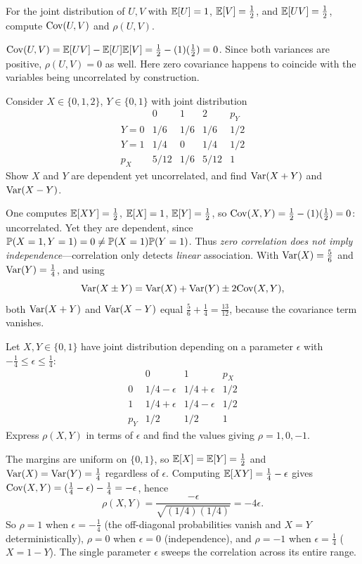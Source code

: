 \begin{example}
For the joint distribution of $U,V$ with
$\mathbb{E}[U]=1$, $\mathbb{E}[V]=\tfrac12$, and $\mathbb{E}[UV]=\tfrac12$, compute $\mathrm{Cov}(U,V)$ and
$\rho(U,V)$.

\solution $\mathrm{Cov}(U,V)=\mathbb{E}[UV]-\mathbb{E}[U]\mathbb{E}[V]=\tfrac12-(1)(\tfrac12)=0$. Since both
variances are positive, $\rho(U,V)=0$ as well. Here zero covariance happens to
coincide with the variables being uncorrelated by construction.
\end{example}

\begin{example}
Consider $X\in\{0,1,2\}$, $Y\in\{0,1\}$ with joint distribution
\[
\begin{array}{c|ccc|c}
 & 0 & 1 & 2 & p_Y\\\hline
 Y=0 & 1/6 & 1/6 & 1/6 & 1/2\\
 Y=1 & 1/4 & 0 & 1/4 & 1/2\\\hline
 p_X & 5/12 & 1/6 & 5/12 & 1
\end{array}
\]
Show $X$ and $Y$ are dependent yet uncorrelated, and find $\mathrm{Var}(X+Y)$ and
$\mathrm{Var}(X-Y)$.

\solution One computes $\mathbb{E}[XY]=\tfrac12$, $\mathbb{E}[X]=1$, $\mathbb{E}[Y]=\tfrac12$, so
$\mathrm{Cov}(X,Y)=\tfrac12-(1)(\tfrac12)=0$: uncorrelated. Yet they are dependent, since
$\mathbb{P}(X=1,Y=1)=0\neq\mathbb{P}(X=1)\mathbb{P}(Y=1)$. Thus \emph{zero correlation does not
imply independence}—correlation only detects \emph{linear} association. With
$\mathrm{Var}(X)=\tfrac56$ and $\mathrm{Var}(Y)=\tfrac14$, and using
\[
  \mathrm{Var}(X\pm Y)=\mathrm{Var}(X)+\mathrm{Var}(Y)\pm 2\mathrm{Cov}(X,Y),
\]
both $\mathrm{Var}(X+Y)$ and $\mathrm{Var}(X-Y)$ equal $\tfrac56+\tfrac14=\tfrac{13}{12}$,
because the covariance term vanishes.
\end{example}

\begin{example}
Let $X,Y\in\{0,1\}$ have joint distribution depending on a parameter $\epsilon$
with $-\tfrac14\le\epsilon\le\tfrac14$:
\[
\begin{array}{c|cc|c}
 & 0 & 1 & p_X\\\hline
 0 & 1/4-\epsilon & 1/4+\epsilon & 1/2\\
 1 & 1/4+\epsilon & 1/4-\epsilon & 1/2\\\hline
 p_Y & 1/2 & 1/2 & 1
\end{array}
\]
Express $\rho(X,Y)$ in terms of $\epsilon$ and find the values giving
$\rho=1,0,-1$.

\solution The margins are uniform on $\{0,1\}$, so $\mathbb{E}[X]=\mathbb{E}[Y]=\tfrac12$ and
$\mathrm{Var}(X)=\mathrm{Var}(Y)=\tfrac14$ regardless of $\epsilon$. Computing
$\mathbb{E}[XY]=\tfrac14-\epsilon$ gives $\mathrm{Cov}(X,Y)=(\tfrac14-\epsilon)-\tfrac14=-\epsilon$,
hence
\[
  \rho(X,Y)=\frac{-\epsilon}{\sqrt{(1/4)(1/4)}}=-4\epsilon.
\]
So $\rho=1$ when $\epsilon=-\tfrac14$ (the off-diagonal probabilities vanish and
$X=Y$ deterministically), $\rho=0$ when $\epsilon=0$ (independence), and
$\rho=-1$ when $\epsilon=\tfrac14$ ($X=1-Y$). The single parameter $\epsilon$
sweeps the correlation across its entire range.
\end{example}

